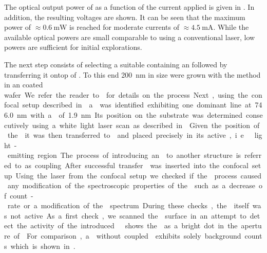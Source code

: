 	The optical output power of \BmFour as a function of the current applied is given in . In addition, the resulting voltages are shown. It can be seen that the maximum power of $\approx \SI{0.6}{\mW}$ is reached for moderate currents of $\approx \SI{4.5}{\mA}$. While the available optical powers are small comparable to using a conventional laser, low powers are sufficient for initial explorations.

	The next step consists of selecting a suitable \nd containing an \siv followed by transferring it ontop of \BmFour. To this end \nds \SI{200}{\nm} in size were grown with the \CVD method in an \ir coated \si wafer. We refer the reader to  for details on the process.

	Next, using the confocal setup described in  a \nd was identified exhibiting one dominant line at \SI{746.0}{nm} with a \lw of \SI{1.9}{nm}. Its position on the substrate was determined consecutively using a white light laser scan as described in . Given the position of the \nd it was then transferred to \BmFour and placed precisely in its active, i.e.\ light-emitting region. The process of introducing an \siv to another structure is referred to as coupling.

	After successful transfer \BmFour was inserted into the confocal setup.
	Using the laser from the confocal setup we checked if the \pp process caused any modification of the spectroscopic properties of the \siv such as a decrease of count-rate or a modification of the \fl spectrum. During these checks, the \VCSEL itself was not active.

	As a first check, we scanned the \VCSEL surface in an attempt to detect the activity of the introduced \siv.  shows the \siv as a bright dot in the aperture of \BmFour. For comparison, a \Vcsel without coupled \siv exhibits solely background counts which is shown in .

